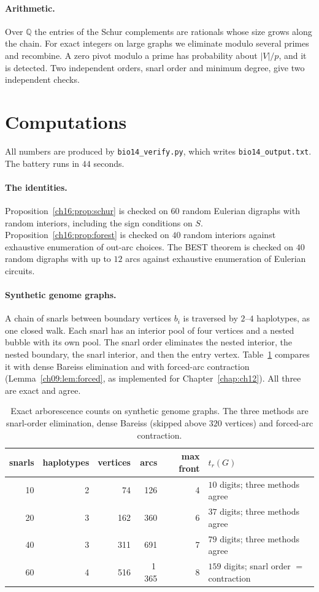 \paragraph{Arithmetic.} Over $\mathbb Q$ the entries of the Schur complements are rationals whose size
grows along the chain. For exact integers on large graphs we eliminate modulo several primes and
recombine. A zero pivot modulo a prime has probability about $|V|/p$, and it is detected. Two
independent orders, snarl order and minimum degree, give two independent checks.

\section{Computations}\label{ch16:sec:comp}

All numbers are produced by \texttt{bio14\_verify.py}, which writes \texttt{bio14\_output.txt}. The
battery runs in $44$ seconds.

\paragraph{The identities.} Proposition~\ref{ch16:prop:schur} is checked on $60$ random Eulerian digraphs
with random interiors, including the sign conditions on $S$. Proposition~\ref{ch16:prop:forest} is checked on
$40$ random interiors against exhaustive enumeration of out-arc choices. The BEST theorem is checked on
$40$ random digraphs with up to $12$ arcs against exhaustive enumeration of Eulerian circuits.

\paragraph{Synthetic genome graphs.} A chain of snarls between boundary vertices $b_i$ is traversed by
$2$--$4$ haplotypes, as one closed walk. Each snarl has an interior pool of four vertices and a nested
bubble with its own pool. The snarl order eliminates the nested interior, the nested boundary, the
snarl interior, and then the entry vertex. Table~\ref{ch16:tab:syn} compares it with dense Bareiss
elimination and with forced-arc contraction (Lemma~\ref{ch09:lem:forced}, as implemented for
Chapter~\ref{chap:ch12}). All three are
exact and agree.

\begin{table}[t]
\centering\small
\begin{tabular}{rrrrrl}
\toprule
snarls & haplotypes & vertices & arcs & max front & $t_r(G)$\\
\midrule
10 & 2 & 74 & 126 & 4 & $10$ digits; three methods agree\\
20 & 3 & 162 & 360 & 6 & $37$ digits; three methods agree\\
40 & 3 & 311 & 691 & 7 & $79$ digits; three methods agree\\
60 & 4 & 516 & 1\,365 & 8 & $159$ digits; snarl order $=$ contraction\\
\bottomrule
\end{tabular}
\caption{Exact arborescence counts on synthetic genome graphs. The three methods are snarl-order
elimination, dense Bareiss (skipped above $320$ vertices) and forced-arc contraction.}\label{ch16:tab:syn}
\end{table}

